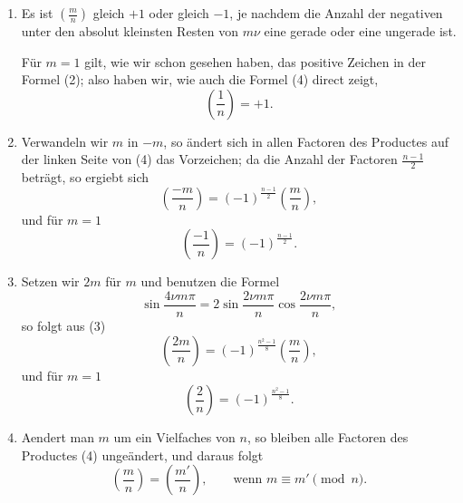\documentclass[11pt]{article}
\begin{document}
\begin{enumerate}[label=\arabic*.,leftmargin=2em]
\item Es ist $\left(\frac mn\right)$ gleich $+1$ oder gleich $-1$, je nachdem die Anzahl der negativen unter den absolut kleinsten Resten von $m\nu$ eine gerade oder eine ungerade ist.

Für $m=1$ gilt, wie wir schon gesehen haben, das positive Zeichen in der Formel (2); also haben wir, wie auch die Formel (4) direct zeigt,
\[
        \left(\frac 1n\right)=+1.
\]

\item Verwandeln wir $m$ in $-m$, so ändert sich in allen Factoren des Productes auf der linken Seite von (4) das Vorzeichen; da die Anzahl der Factoren $\frac{n-1}{2}$ beträgt, so ergiebt sich
\[
\tag{3'}
        \left(\frac{-m}{n}\right)=(-1)^{\frac{n-1}{2}}\left(\frac mn\right),
\]
und für $m=1$
\[
\tag{4'}
        \left(\frac{-1}{n}\right)=(-1)^{\frac{n-1}{2}}.
\]

\item Setzen wir $2m$ für $m$ und benutzen die Formel
\[
        \sin\frac{4\nu m\pi}{n}
        =2\sin\frac{2\nu m\pi}{n}\cos\frac{2\nu m\pi}{n},
\]
so folgt aus (3)
\[
\tag{5}
        \left(\frac{2m}{n}\right)=(-1)^{\frac{n^2-1}{8}}\left(\frac mn\right),
\]
und für $m=1$
\[
\tag{6}
        \left(\frac 2n\right)=(-1)^{\frac{n^2-1}{8}}.
\]

\item Aendert man $m$ um ein Vielfaches von $n$, so bleiben alle Factoren des Productes (4) ungeändert, und daraus folgt
\[
\tag{7}
        \left(\frac mn\right)=\left(\frac {m'}n\right),
        \qquad\text{wenn }m\equiv m'\pmod n.
\]
\end{enumerate}
\end{document}
